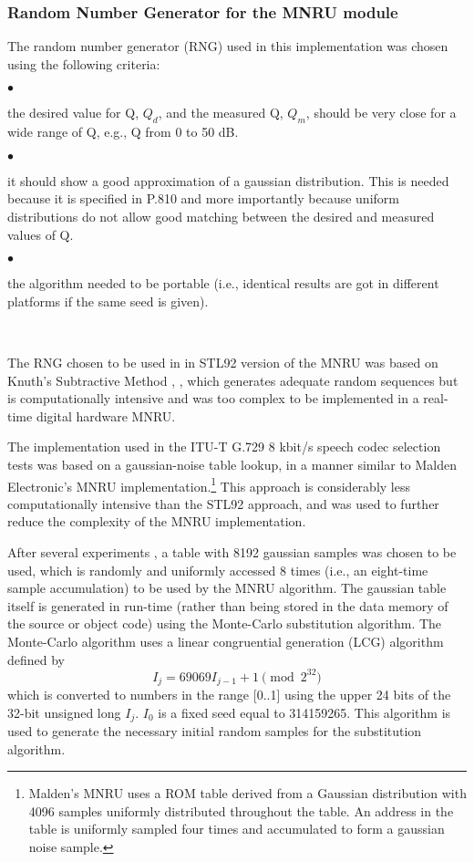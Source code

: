 \subsubsection{Random Number Generator for the MNRU module}

The random number generator (RNG) used in this implementation was chosen using the following criteria:

\begin{minipage}{130mm}
 $\bullet$ \parbox[t]{120mm}{
               the desired value for Q, $Q_d$, and the measured Q, $Q_m$, should be very close for a wide range of Q,
                e.g., Q from 0 to 50 dB.
               \bigskip}

 $\bullet$ \parbox[t]{120mm}{
               it should show a good approximation of a gaussian distribution.
               This is needed because it is specified in P.810 and more importantly because uniform distributions do not
               allow good matching between the desired and measured values of Q. \bigskip}

 $\bullet$ \parbox[t]{120mm}{
               the algorithm needed to be portable (i.e., identical results are got in different platforms if the same
                seed is given).}\\
\end{minipage}

The RNG chosen to be used in in STL92 version of the MNRU was based on Knuth's Subtractive Method \cite{Recipes},
\cite[Parts 3.2--3.3]{Knuth}, which generates adequate random sequences but is computationally intensive and was too
complex to be implemented in a real-time digital hardware MNRU.

The implementation used in the ITU-T G.729 8 kbit/s speech codec selection tests was based on a gaussian-noise table
lookup, in a manner similar to Malden Electronic's MNRU implementation.\footnote{\SF Malden's MNRU uses a ROM table
derived from  a Gaussian distribution with 4096 samples uniformly
distributed throughout the table. An address in the table is
uniformly sampled four times and accumulated to form a gaussian noise
sample.}
This approach is considerably less computationally intensive than the STL92 approach, and was used to further reduce the
complexity of the MNRU implementation.

After several experiments \cite{Duo-MNRU}, a table with 8192 gaussian samples was chosen to be used, which is randomly
and uniformly accessed 8 times (i.e., an eight-time sample accumulation) to be used by the MNRU algorithm.
The gaussian table itself is generated in run-time (rather than being stored in the data memory of the source or object
code) using the Monte-Carlo substitution algorithm.
The Monte-Carlo algorithm uses a linear congruential generation (LCG) algorithm defined by
\[
            I_{j} = 69069 I_{j-1} + 1 \pmod{2^{32}}
\]
which is converted to numbers in the range [0..1] using the upper 24 bits of the 32-bit unsigned long $I_j$.
$I_0$ is a fixed seed equal to 314159265.
This algorithm is used to generate the necessary initial random samples for the substitution algorithm.

